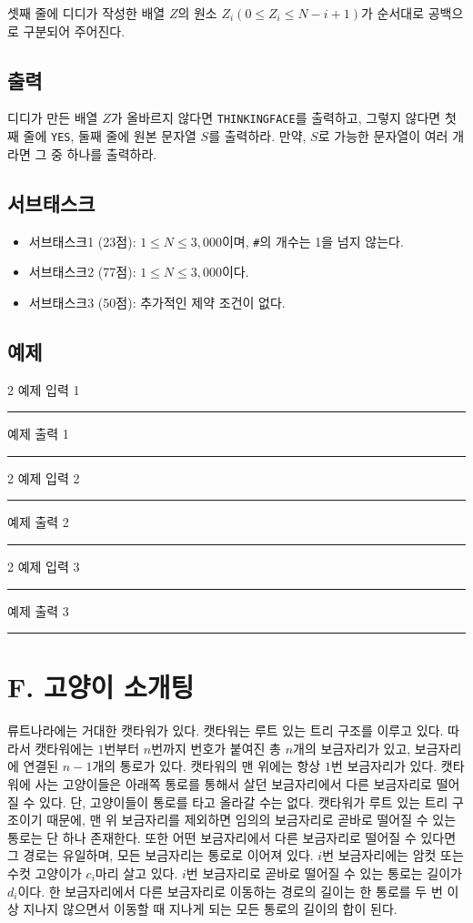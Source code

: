 \documentclass{article}
\def\inputdataname{예제 입력 } %
\def\outputdataname{예제 출력 } %
\newcommand{\iodataNo}[2]{%
	\begin{minipage}{\textwidth}
		\begin{multicols}{2}
			{\inputdataname#2} \\
			\rule{\columnwidth}{1pt}
			
			\columnbreak
			{\outputdataname#2} \\
			\rule{\columnwidth}{1pt}
			
		\end{multicols}
		\vspace{\baselineskip}
	\end{minipage}

}
\begin{document}
셋째 줄에 디디가 작성한 배열 $Z$의 원소 $Z_i(0 \le Z_i \le N-i+1)$가 순서대로 공백으로 구분되어 주어진다.

\subsection{출력}
디디가 만든 배열 $Z$가 올바르지 않다면 \texttt{THINKINGFACE}를 출력하고, 그렇지 않다면 첫째 줄에 \texttt{YES}, 둘째 줄에 원본 문자열 $S$를 출력하라. 만약, $S$로 가능한 문자열이 여러 개라면 그 중 하나를 출력하라.

\subsection{서브태스크}
\begin{itemize}
	\item 서브태스크1 (23점): $1 \le N \le 3,000$이며, \texttt{\#}의 개수는 1을 넘지 않는다.
	\item 서브태스크2 (77점): $1 \le N \le 3,000$이다.
	\item 서브태스크3 (50점): 추가적인 제약 조건이 없다.
\end{itemize}

\subsection{예제}
\iodataNo{z1}{1}
\iodataNo{z2}{2}
\iodataNo{z3}{3}

\newpage

\section{F. 고양이 소개팅}
류트나라에는 거대한 캣타워가 있다. 캣타워는 루트 있는 트리 구조를 이루고 있다. 따라서 캣타워에는 $1$번부터 $n$번까지 번호가 붙여진 총 $n$개의 보금자리가 있고, 보금자리에 연결된 $n-1$개의 통로가 있다. 캣타워의 맨 위에는 항상 $1$번 보금자리가 있다. 캣타워에 사는 고양이들은 아래쪽 통로를 통해서 살던 보금자리에서 다른 보금자리로 떨어질 수 있다. 단, 고양이들이 통로를 타고 올라갈 수는 없다. 캣타워가 루트 있는 트리 구조이기 때문에, 맨 위 보금자리를 제외하면 임의의 보금자리로 곧바로 떨어질 수 있는 통로는 단 하나 존재한다. 또한 어떤 보금자리에서 다른 보금자리로 떨어질 수 있다면 그 경로는 유일하며, 모든 보금자리는 통로로 이어져 있다. $i$번 보금자리에는 암컷 또는 수컷 고양이가 $c_i$마리 살고 있다. $i$번 보금자리로 곧바로 떨어질 수 있는 통로는 길이가 $d_i$이다. 한 보금자리에서 다른 보금자리로 이동하는 경로의 길이는 한 통로를 두 번 이상 지나지 않으면서 이동할 때 지나게 되는 모든 통로의 길이의 합이 된다.\newline
\end{document}
